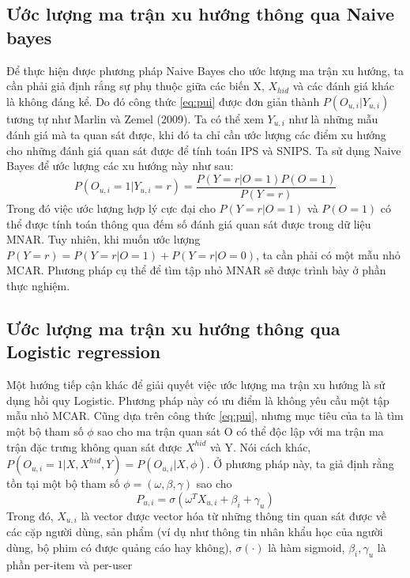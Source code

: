 \subsection{Ước lượng ma trận xu hướng thông qua Naive bayes}

Để thực hiện được phương pháp Naive Bayes cho ước lượng ma trận xu hướng, ta cần phải giả định rắng sự phụ thuộc giữa các biến X,   $X_{hid}$ và các đánh giá khác là không đáng kể. Do đó công thức \ref{eq:pui} được đơn giản thành $P(O_{u,i}|Y_{u,i})$ tương tự như Marlin và Zemel (2009). Ta có thể xem $Y_{u,i}$ như là những mẫu đánh giá mà ta quan sát được, khi đó ta chỉ cần ước lượng các điểm xu hướng cho những đánh giá quan sát được để tính toán IPS và SNIPS. Ta sử dụng Naive Bayes để ước lượng các xu hướng này như sau:
\begin{equation}
\label{eq:pnb}
    P(O_{u,i} = 1| Y_{u,i} = r) = \frac{P(Y=r|O=1)P(O=1)}{P(Y=r)}
\end{equation}
Trong đó việc ước lượng hợp lý cực đại cho $P(Y=r|O=1)$ và $P(O=1)$ có thể được tính toán thông qua đếm số đánh giá  quan sát được trong dữ liệu MNAR. Tuy nhiên, khi muốn ước lượng $P(Y=r) = P(Y=r|O=1) + P(Y=r|O=0)$, ta cần phải có một mẫu nhỏ MCAR. Phương pháp cụ thể để tìm tập nhỏ MNAR sẽ được trình bày ở phần thực nghiệm.  

\subsection{Ước lượng ma trận xu hướng thông qua Logistic regression}
Một hướng tiếp cận khác để giải quyết việc  ước lượng ma trận xu hướng là sử dụng hồi quy Logistic. Phương pháp này có ưu điểm là không yêu cầu một tập mẫu nhỏ MCAR. Cũng dựa trên công thức \ref{eq:pui}, nhưng mục tiêu của ta là tìm một bộ tham số $\phi$ sao cho ma trận quan sát O có thể độc lập với ma trận ma
trận đặc trưng không quan sát được $X^{hid}$ và Y. Nói cách khác, $P(O_{u,i} = 1|X, X^{hid},Y) = P(O_{u,i}|X,\phi)$. Ở phương pháp này, ta giả định rằng tồn tại một bộ tham số $\phi=(\omega, \beta, \gamma)$ sao cho
\begin{equation}
    \label{eq:plr}
    P_{u,i} = \sigma(\omega^TX_{u,i} + \beta_i + \gamma_u)
\end{equation}
Trong đó, $X_{u,i}$ là vector được vector hóa từ những thông tin quan sát được về các cặp người dùng, sản phẩm (ví dụ như thông tin nhân khẩu học của người dùng, bộ phim có được quảng cáo hay không), $\sigma(\cdot)$ là hàm sigmoid, $\beta_i, \gamma_u$ là phần per-item và per-user

